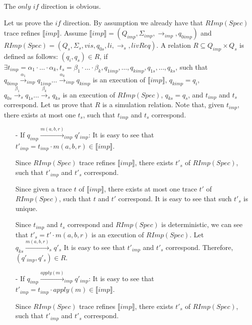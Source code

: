 \forget
{
The $\textit{only if}$ direction is obvious.

Let us prove the $\textit{if}$ direction. By assumption we already have that $RImp(Spec)$ trace refines $\llbracket imp \rrbracket$. Assume $\llbracket imp \rrbracket = (Q_{imp},\Sigma_{imp},\rightarrow_{imp},q_{0imp})$ and $RImp(Spec) = (Q_s,\Sigma_s,vis,q_{0s},li,\rightarrow_s,livReq)$. A relation $R \subseteq Q_{imp} \times Q_s$ is defined as follows: $(q_i,q_s) \in R$, if $\exists t_{imp} = \alpha_1 \cdot \ldots \cdot \alpha_k,t_s = \beta_1 \cdot \ldots \cdot \beta_k, q_{1imp}, \ldots, q_{kimp}, q_{1s}, \ldots, q_{ks}$, such that $q_{0imp} {\xrightarrow{\alpha_1}}_{imp} q_{1imp} \ldots {\xrightarrow{\alpha_k}}_{imp} q_{kimp}$ is an execution of $\llbracket imp \rrbracket$, $q_{kimp}=q_i$, $q_{0s} {\xrightarrow{\beta_1}}_s q_{1s} \ldots {\xrightarrow{\beta_k}}_s q_{ks}$ is an execution of $RImp(Spec)$, $q_{ks}=q_s$, and $t_{imp}$ and $t_s$ correspond. Let us prove that $R$ is a simulation relation. Note that, given $t_{imp}$, there exists at most one $t_s$, such that $t_{imp}$ and $t_s$ correspond.

\begin{itemize}
\setlength{\itemsep}{0.5pt}
\item[-] If $q_{imp} {\xrightarrow{m(a,b,r)}}_{imp} q'_{imp}$: It is easy to see that $t'_{imp} = t_{imp} \cdot m(a,b,r) \in \llbracket imp \rrbracket$.

Since $RImp(Spec)$ trace refines $\llbracket imp \rrbracket$, there exists $t'_s$ of $RImp(Spec)$, such that $t'_{imp}$ and $t'_s$ correspond.

Since given a trace $t$ of $\llbracket imp \rrbracket$, there exists at most one trace $t'$ of $RImp(Spec)$, such that $t$ and $t'$ correspond. It is easy to see that such $t'_s$ is unique.

Since $t_{imp}$ and $t_s$ correspond and $RImp(Spec)$ is deterministic, we can see that $t'_s = t' \cdot m(a,b,r)$ is an execution of $RImp(Spec)$. Let $q_{ks} {\xrightarrow{m(a,b,r)}}_s q'_s$ It is easy to see that $t'_{imp}$ and $t'_s$ correspond. Therefore, $(q'_{imp},q'_s) \in R$.

\item[-] If $q_{imp} {\xrightarrow{apply(m)}}_{imp} q'_{imp}$: It is easy to see that $t'_{imp} = t_{imp} \cdot apply(m) \in \llbracket imp \rrbracket$.

Since $RImp(Spec)$ trace refines $\llbracket imp \rrbracket$, there exists $t'_s$ of $RImp(Spec)$, such that $t'_{imp}$ and $t'_s$ correspond.


\end{itemize}}
